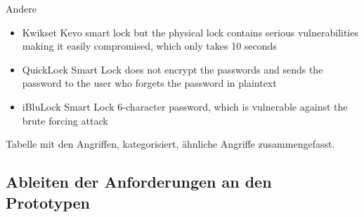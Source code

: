 	Andere
	\begin{itemize}
		\item Kwikset Kevo smart lock but the physical lock contains serious vulnerabilities making it easily compromised, which only takes 10 seconds\cite{Ye2017}
		\item QuickLock Smart Lock does not encrypt the passwords and sends the password to the user who forgets the password in plaintext\cite{Ye2017}
		\item iBluLock Smart Lock 6-character password, which is vulnerable against the brute forcing attack\cite{Ye2017}
	\end{itemize}

	Tabelle mit den Angriffen, kategorisiert, ähnliche Angriffe zusammengefasst.
	
	
	\subsection{Ableiten der Anforderungen an den Prototypen}
	\label{sec:requirements_prototype}
		